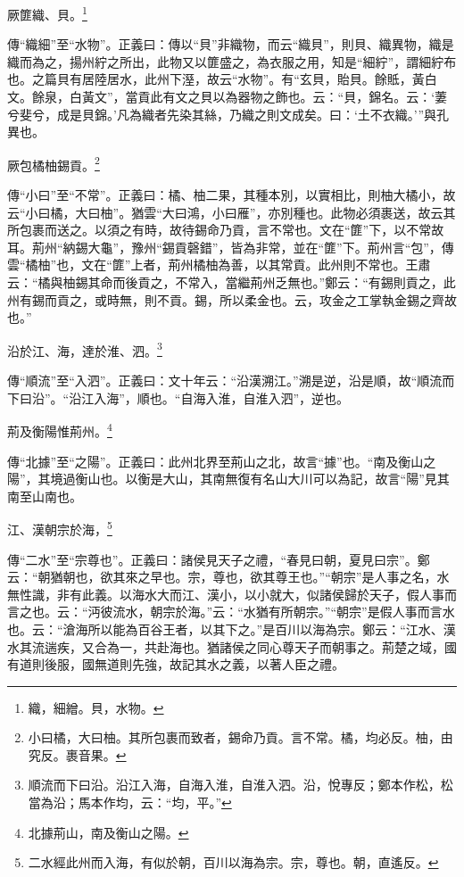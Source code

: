 厥篚織、貝。\footnote{織，細繒。貝，水物。}

{\noindent\zhuan{}\fzbyks 傳“織細”至“水物”。正義曰：傳以“貝”非織物，而云“織貝”，則貝、織異物，織是織而為之，揚州紵之所出，此物又以篚盛之，為衣服之用，知是“細紵”，謂細紵布也。之篇貝有居陸居水，此州下溼，故云“水物”。有“玄貝，貽貝。餘貾，黃白文。餘泉，白黃文”，當貢此有文之貝以為器物之飾也。云：“貝，錦名。云：‘萋兮斐兮，成是貝錦。’凡為織者先染其絲，乃織之則文成矣。曰：‘土不衣織。’”與孔異也。 \par}

厥包橘柚錫貢。\footnote{小曰橘，大曰柚。其所包裹而致者，錫命乃貢。言不常。橘，均必反。柚，由究反。裹音果。}

{\noindent\zhuan{}\fzbyks 傳“小曰”至“不常”。正義曰：橘、柚二果，其種本別，以實相比，則柚大橘小，故云“小曰橘，大曰柚”。猶雲“大曰鴻，小曰雁”，亦別種也。此物必須裹送，故云其所包裹而送之。以須之有時，故待錫命乃貢，言不常也。文在“篚”下，以不常故耳。荊州“納錫大龜”，豫州“錫貢磬錯”，皆為非常，並在“篚”下。荊州言“包”，傳雲“橘柚”也，文在“篚”上者，荊州橘柚為善，以其常貢。此州則不常也。王肅云：“橘與柚錫其命而後貢之，不常入，當繼荊州乏無也。”鄭云：“有錫則貢之，此州有錫而貢之，或時無，則不貢。錫，所以柔金也。云，攻金之工掌執金錫之齊故也。” \par}

沿於江、海，達於淮、泗。\footnote{順流而下曰沿。沿江入海，自海入淮，自淮入泗。沿，悅專反；鄭本作松，松當為沿；馬本作均，云：“均，平。”}

{\noindent\zhuan{}\fzbyks 傳“順流”至“入泗”。正義曰：文十年云：“沿漢溯江。”溯是逆，沿是順，故“順流而下曰沿”。“沿江入海”，順也。“自海入淮，自淮入泗”，逆也。 \par}

荊及衡陽惟荊州。\footnote{北據荊山，南及衡山之陽。}

{\noindent\zhuan{}\fzbyks 傳“北據”至“之陽”。正義曰：此州北界至荊山之北，故言“據”也。“南及衡山之陽”，其境過衡山也。以衡是大山，其南無復有名山大川可以為記，故言“陽”見其南至山南也。 \par}

江、漢朝宗於海，\footnote{二水經此州而入海，有似於朝，百川以海為宗。宗，尊也。朝，直遙反。}

{\noindent\zhuan{}\fzbyks 傳“二水”至“宗尊也”。正義曰：諸侯見天子之禮，“春見曰朝，夏見曰宗”。鄭云：“朝猶朝也，欲其來之早也。宗，尊也，欲其尊王也。”“朝宗”是人事之名，水無性識，非有此義。以海水大而江、漢小，以小就大，似諸侯歸於天子，假人事而言之也。云：“沔彼流水，朝宗於海。”云：“水猶有所朝宗。”“朝宗”是假人事而言水也。云：“滄海所以能為百谷王者，以其下之。”是百川以海為宗。鄭云：“江水、漢水其流遄疾，又合為一，共赴海也。猶諸侯之同心尊天子而朝事之。荊楚之域，國有道則後服，國無道則先強，故記其水之義，以著人臣之禮。 \par}

